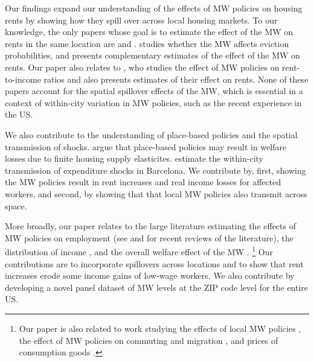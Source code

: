 Our findings expand our understanding of the effects of MW policies on
housing rents by showing how they spill over across local housing markets.
To our knowledge, the only papers whose goal is to estimate the effect of the 
MW on rents in the same location are \textcite{Tidemann2018} and 
\textcite{Yamagishi2021}.
\textcite{AgarwalEtAl2022} studies whether the MW affects eviction 
probabilities, and presents complementary estimates of the effect of the MW on 
rents.
Our paper also relates to \textcite{Hughes2020}, who studies the effect of 
MW policies on rent-to-income ratios and also presents estimates of their 
effect on rents.
None of these papers account for the spatial spillover effects of the MW,
which is essential in a context of within-city variation in MW policies, 
such as the recent experience in the US.

We also contribute to the understanding of place-based policies and the spatial 
transmission of shocks.
\textcite{KlineMoretti2014} argue that place-based policies may result in 
welfare losses due to finite housing supply elasticites.
\textcite{AllenEtAl2020} estimate the within-city transmission of expenditure 
shocks in Barcelona.
We contribute by, first, showing the MW policies result in rent increases
and real income losses for affected workers, and second, by showing that
that local MW policies also transmit across space.

More broadly, our paper relates to the large literature estimating the effects
of MW policies on employment
(see \cite{Dube2019} and \cite{NeumarkShirley2021} for recent reviews of the 
literature), 
the distribution of income \parencite[e.g.,][]{Lee1999, AutorEtAl2016, 
	Dube2019Income}, 
and the overall welfare effect of the MW \parencite{AhlfeldtEtAl2022,
	BergerHerkenhoffMongey2022}.%
\footnote{Our paper is also related to work studying 
	the effects of local MW policies 
	\parencite[e.g.,][]{DubeLindner2021, JardimEtAl2022seattle}, 
	the effect of MW policies on commuting and migration 
	\parencite[e.g.,][]{Cadena2014, Monras2019, PerezPerez2021}, 
	and prices of consumption goods 
	\parencite[e.g.,][]{Aaronson2001, AllegrettoReich2018, Leung2021}.} %
Our contributions are to incorporate spillovers across locations 
\parencite[as in the recent work by][]{JardimEtAl2022discontinuity} and to show 
that rent increases erode some income gains of low-wage workers.
We also contribute by developing a novel panel dataset of MW levels at the 
ZIP code level for the entire US.

